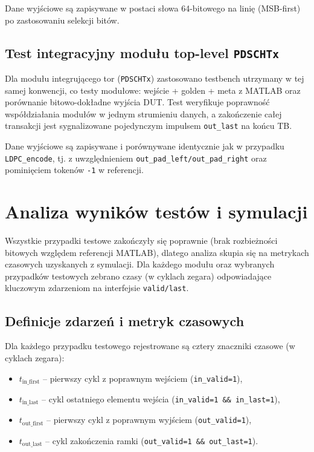Dane wyjściowe są zapisywane w postaci słowa 64-bitowego na linię (MSB-first) po zastosowaniu selekcji bitów.

\subsection{Test integracyjny modułu top-level \texttt{PDSCHTx}}
\label{subsec:tb_pdschtx}

Dla modułu integrującego tor (\texttt{PDSCHTx}) zastosowano testbench utrzymany w tej samej konwencji,
co testy modułowe: wejście + golden + meta z MATLAB oraz porównanie bitowo-dokładne wyjścia DUT.
Test weryfikuje poprawność współdziałania modułów w jednym strumieniu danych, a zakończenie całej transakcji
jest sygnalizowane pojedynczym impulsem \texttt{out\_last} na końcu TB.

Dane wyjściowe są zapisywane i porównywane identycznie jak w przypadku \texttt{LDPC\_encode},
tj. z uwzględnieniem \texttt{out\_pad\_left/out\_pad\_right} oraz pominięciem tokenów \texttt{-1} w referencji.




\section{Analiza wyników testów i symulacji}
\label{sec:analiza_symulacji}

Wszystkie przypadki testowe zakończyły się poprawnie (brak rozbieżności bitowych względem referencji MATLAB),
dlatego analiza skupia się na metrykach czasowych uzyskanych z symulacji. Dla każdego modułu oraz wybranych
przypadków testowych zebrano czasy (w cyklach zegara) odpowiadające kluczowym zdarzeniom na interfejsie
\texttt{valid/last}.

\subsection{Definicje zdarzeń i metryk czasowych}
\label{subsec:latency_definitions}

Dla każdego przypadku testowego rejestrowane są cztery znaczniki czasowe (w cyklach zegara):
\begin{itemize}
    \item $t_{\mathrm{in\_first}}$ -- pierwszy cykl z poprawnym wejściem (\texttt{in\_valid=1}),
    \item $t_{\mathrm{in\_last}}$  -- cykl ostatniego elementu wejścia (\texttt{in\_valid=1 \&\& in\_last=1}),
    \item $t_{\mathrm{out\_first}}$ -- pierwszy cykl z poprawnym wyjściem (\texttt{out\_valid=1}),
    \item $t_{\mathrm{out\_last}}$  -- cykl zakończenia ramki (\texttt{out\_valid=1 \&\& out\_last=1}).
\end{itemize}

